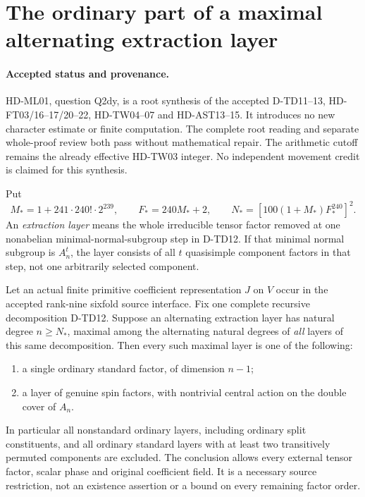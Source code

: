 \section{The ordinary part of a maximal alternating extraction layer}
\label{sec:maximal-alternating-layer}

\paragraph{Accepted status and provenance.}
HD-ML01, question Q2dy, is a root synthesis of the accepted
D-TD11--13, HD-FT03/16--17/20--22, HD-TW04--07 and HD-AST13--15.
It introduces no new character estimate or finite computation. The
complete root reading and separate whole-proof review both pass
without mathematical repair. The arithmetic cutoff remains the already
effective HD-TW03 integer. No independent movement credit is claimed
for this synthesis.

Put
\[
 M_*=1+241\cdot240!\cdot2^{239},\qquad F_*=240M_*+2,
 \qquad N_*=[100(1+M_*)F_*^{240}]^2.
 \tag{ML.1}
\]
An \emph{extraction layer} means the whole irreducible tensor factor
removed at one nonabelian minimal-normal-subgroup step in D-TD12.
If that minimal normal subgroup is $A_n^t$, the layer consists of all
$t$ quasisimple component factors in that step, not one arbitrarily
selected component.

\begin{theorem}[HD-ML01]
Let an actual finite primitive coefficient representation $J$ on $V$
occur in the accepted rank-nine sixfold source interface. Fix one
complete recursive decomposition D-TD12. Suppose an alternating
extraction layer has natural degree $n\ge N_*$, maximal among the
alternating natural degrees of \emph{all} layers of this same
decomposition. Then every such maximal layer is one of the following:
\begin{enumerate}
\item a single ordinary standard factor, of dimension $n-1$;
\item a layer of genuine spin factors, with nontrivial central action
on the double cover of $A_n$.
\end{enumerate}
In particular all nonstandard ordinary layers, including ordinary
split constituents, and all ordinary standard layers with at least
two transitively permuted components are excluded. The conclusion
allows every external tensor factor, scalar phase and original
coefficient field. It is a necessary source restriction, not an
existence assertion or a bound on every remaining factor order.
\end{theorem}

